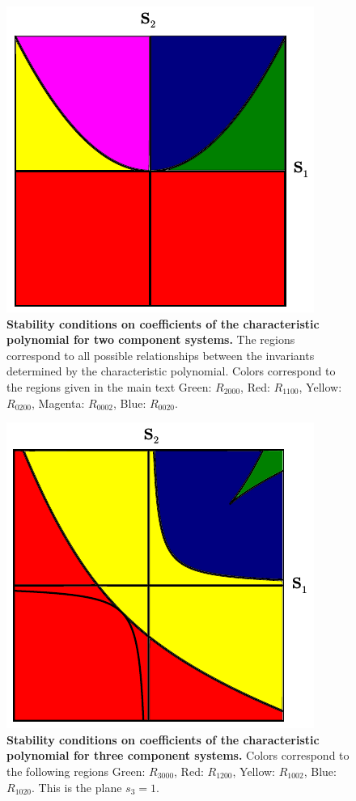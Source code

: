 \begin{figure}[!ht]
\centering
\noindent\includegraphics[width=0.5\columnwidth]{fig/region2x2.pdf}
\caption{{\bf Stability conditions on coefficients of the characteristic polynomial for two component systems.} The regions correspond to all possible relationships between the invariants determined by the characteristic polynomial. Colors correspond to the regions given in the main text Green: $R_{2000}$, Red: $R_{1100}$, Yellow: $R_{0200}$, Magenta: $R_{0002}$, Blue: $R_{0020}$.}
\label{fig:region2x2}
\end{figure}

\begin{figure}[!ht]
\centering
\noindent\includegraphics[width=0.5\columnwidth]{fig/region3x3.pdf}
\caption{{\bf Stability conditions on coefficients of the characteristic polynomial for three component systems.} Colors correspond to the following regions Green: $R_{3000}$, Red: $R_{1200}$, Yellow: $R_{1002}$, Blue: $R_{1020}$. This is the plane $s_3=1$.}
\label{fig:region3x3}
\end{figure}


